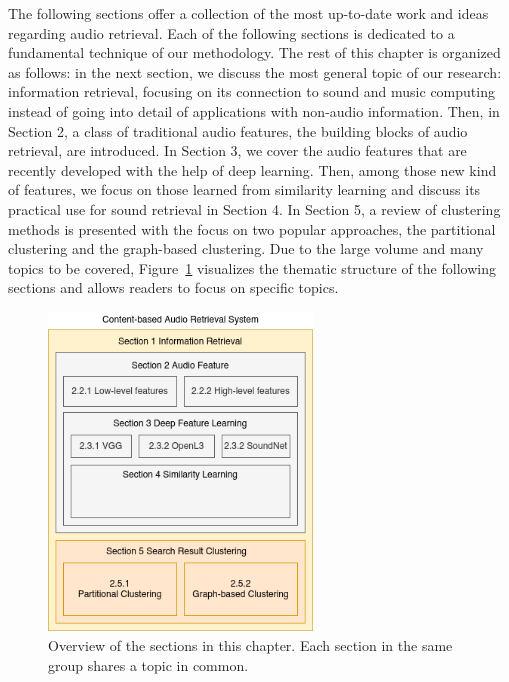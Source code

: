 The following sections offer a collection of the most up-to-date work and ideas regarding audio retrieval.
Each of the following sections is dedicated to a fundamental technique of our methodology. 
The rest of this chapter is organized as follows: in the next section, we discuss the most general topic of our research: information retrieval, focusing on its connection to sound and music computing instead of going into detail of applications with non-audio information. Then, in Section 2, a class of traditional audio features, the building blocks of audio retrieval, are introduced. In Section 3, we cover the audio features that are recently developed with the help of deep learning. Then, among those new kind of features, we focus on those learned from similarity learning and discuss its practical use for sound retrieval in Section 4. In Section 5, a review of clustering methods is presented with the focus on two popular approaches, the partitional clustering and the graph-based clustering. Due to the large volume and many topics to be covered, Figure~\ref{toc-figrue} visualizes the thematic structure of the following sections and allows readers to focus on specific topics.

\begin{figure}[htb]
	\centering
	\includegraphics[width=7cm]{Figures/conceptual_relationship_of_sections.png}
	\caption{Overview of the sections in this chapter. Each section in the same group shares a topic in common.}
	\label{toc-figrue}
\end{figure}

